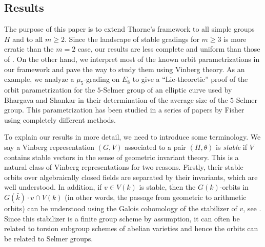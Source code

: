 \documentclass{article} %
\numberwithin{equation}{section}
\theoremstyle{definition}
\begin{document}
\subsection{Results}
The purpose of this paper is to extend Thorne's framework to all simple groups $H$ and to all $m \geq 2$.
Since the landscape of stable gradings for $m\geq 3$ is more erratic than the $m=2$ case, our results are less complete and uniform than those of \cite{Thorne-thesis}. 
On the other hand, we interpret most of the known orbit parametrizations in our framework and pave the way to study them using Vinberg theory.
As an example, we analyze a $\mu_5$-grading on $E_8$ to give a ``Lie-theoretic'' proof of the orbit parametrization for the $5$-Selmer group of an elliptic curve used by Bhargava and Shankar \cite{BS-5Selmer} in their determination of the average size of the $5$-Selmer group.
This parametrization has been studied in a series of papers by Fisher \cite{Fisher-invariantsgenusone, Fisher-invarianttheorynormalquinticI, Fisher-invarianttheoryquinticII, Fisher-minimisationreduction5coverings} using completely different methods.

To explain our results in more detail, we need to introduce some terminology.
We say a Vinberg representation $(G,V)$ associated to a pair $(H, \theta)$ is \emph{stable} if $V$ contains stable vectors in the sense of geometric invariant theory.
This is a natural class of Vinberg representations for two reasons.
Firstly, their stable orbits over algebraically closed fields are separated by their invariants, which are well understood.
In addition, if $v\in V(k)$ is stable, then the $G(k)$-orbits in $G(\bar{k})\cdot v \cap V(k)$ (in other words, the passage from geometric to arithmetic orbits) can be understood using the Galois cohomology of the stabilizer of $v$, see \cite[Section 2, Proposition 1]{BhargavaGross-AIT}.
Since this stabilizer is a finite group scheme by assumption, it can often be related to torsion subgroup schemes of abelian varieties and hence the orbits can be related to Selmer groups.
\end{document}
